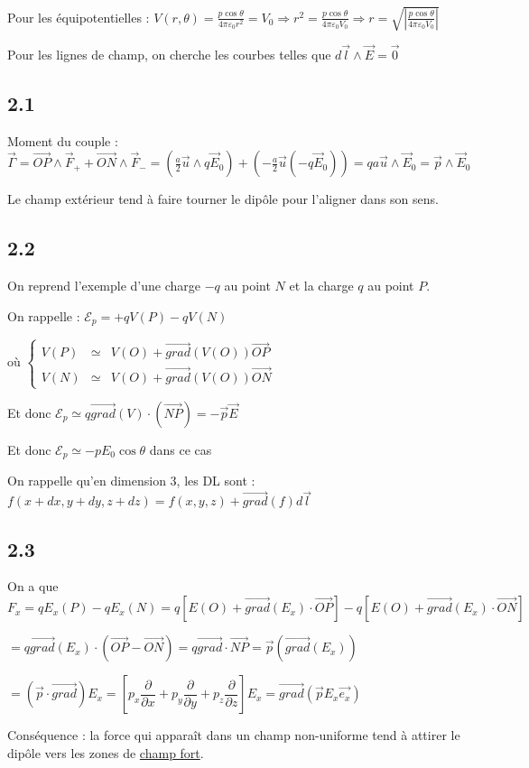\documentclass[a4paper,12pt]{book}
\begin{document}
\par Pour les équipotentielles : $V(r,\theta)= \frac{p\cos\theta}{4\pi\varepsilon_0r^2}=V_0\Rightarrow r^2 = \frac{p\cos\theta}{4\pi\varepsilon_0V_0} \Rightarrow r = \sqrt{\left|\frac{p\cos\theta}{4\pi\varepsilon_0V_0}\right|}$
\par Pour les lignes de champ, on cherche les courbes telles que $d\vec{l}\wedge\vec{E}=\vec{0}$

\subsection{2.1}
Moment du couple : $\vec{\Gamma}=\vec{OP}\wedge\vec{F}_+ + \vec{ON}\wedge\vec{F}_- = \left(\frac{a}{2}\vec{u}\wedge q\vec{E}_0\right) + \left(-\frac{a}{2}\vec{u}(-q\vec{E}_0)\right) = qa\vec{u}\wedge\vec{E}_0 = \vec{p}\wedge\vec{E}_0$
\par Le champ extérieur tend à faire tourner le dipôle pour l'aligner dans son sens.

\subsection{2.2}
On reprend l'exemple d'une charge $-q$ au point $N$ et la charge $q$ au point $P$. \par On rappelle : $\mathcal{E}_p=+qV(P)-qV(N)$ \par où $\left\{\begin{array}{rcl} V(P) & \simeq & V(O) + \vec{grad}(V(O))\vec{OP} \\ V(N) & \simeq & V(O) + \vec{grad}(V(O))\vec{ON}\end{array}\right.$
\par Et donc $\mathcal{E}_p \simeq q\vec{grad}(V)\cdot(\vec{NP}) =-\vec{p}\vec{E}$ \par Et donc $\mathcal{E}_p \simeq -pE_0\cos\theta$ dans ce cas
\par On rappelle qu'en dimension 3, les DL sont : $f(x+dx,y+dy,z+dz) = f(x,y,z) + \vec{grad}(f)d\vec{l}$

\subsection{2.3}
On a que $F_x=qE_x(P)-qE_x(N) = q\left[E(O) + \vec{grad}(E_x)\cdot\vec{OP}\right]-q\left[E(O)+\vec{grad}(E_x)\cdot\vec{ON}\right] $\par $= q\vec{grad}(E_x)\cdot(\vec{OP}-\vec{ON}) = q\vec{grad}\cdot\vec{NP} = \vec{p}(\vec{grad}(E_x))$ \par $ = (\vec{p}\cdot\vec{grad})E_x = \left[p_x\dfrac{\partial}{\partial x} + p_y\dfrac{\partial }{\partial y} + p_z\dfrac{\partial}{\partial z}\right]E_x = \vec{grad}(\vec{p}E_x\vec{e_x})$
\par Conséquence : la force qui apparaît dans un champ non-uniforme tend à attirer le dipôle vers les zones de \underline{champ fort}.
\end{document}
